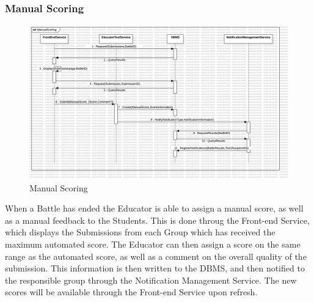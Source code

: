 \subsubsection{Manual Scoring}
\begin{figure}[H]
    \centering
    \includegraphics[width=\textwidth]{Graphics/Sequence Diagrams/ManualScoring.png}
    \caption{Manual Scoring}
    \label{fig:manualscoring}
\end{figure}
When a Battle has ended the Educator is able to assign a manual score, as well as a manual feedback to the Students. This is done throug the Front-end Service, which displays the Submissions from each Group which has received the maximum automated score. The Educator can then assign a score on the same range as the automated score, as well as a comment on the overall quality of the submission. This information is then written to the DBMS, and then notified to the responsible group through the Notification Management Service. 
The new scores will be available through the Front-end Service upon refresh. 


